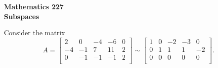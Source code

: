 \documentclass[12pt]{article}
\begin{document}
\noindent
{\bf Mathematics 227} \\ 
{\bf Subspaces}

\bigskip
Consider the matrix
  $$A =
  \left[
    \begin{array}{ccccc}
      2 & 0 & -4 & -6 & 0 \\
      -4 & -1 & 7 & 11 & 2 \\
      0 & -1 & -1 & -1 & 2 \\
    \end{array}
  \right]
  \sim
  \left[
    \begin{array}{ccccc}
      1 & 0 & -2 & -3 & 0 \\
      0 & 1 & 1 & 1 & -2 \\
      0 & 0 & 0 & 0 & 0 \\
    \end{array}
  \right].
  $$
\end{document}
